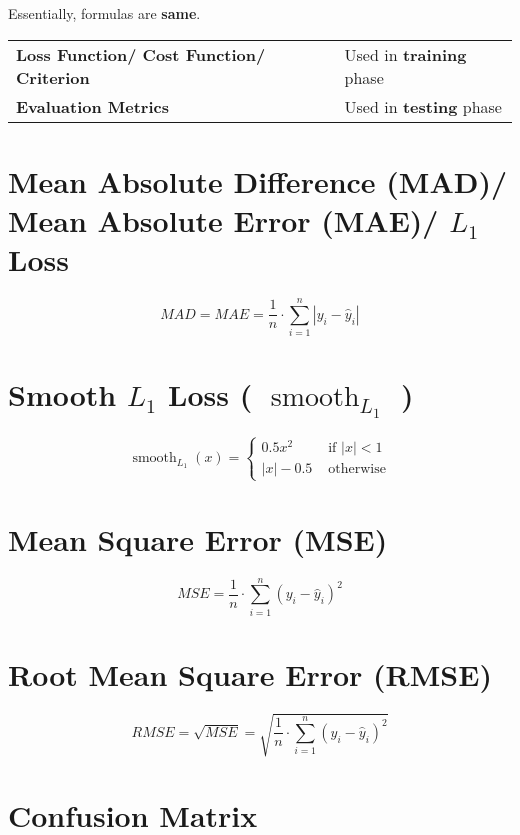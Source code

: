 Essentially, formulas are \textbf{same}.

\begin{table}[h]
    \begin{tabular}{l l}
        \textbf{Loss Function/ Cost Function/ Criterion} & Used in \textbf{training} phase \\
        
        \textbf{Evaluation Metrics} & Used in \textbf{testing} phase \\
    \end{tabular}
\end{table}


\section{Mean Absolute Difference (MAD)/ Mean Absolute Error (MAE)/ $L_1$ Loss}\label{Mean Absolute Difference (MAD)}\label{Mean Absolute Error (MAE)}\label{L1 Loss}

\[
    MAD = MAE = \displaystyle\dfrac{1}{n} \cdot \sum_{i=1}^{n} \left| y_i - \hat{y}_i \right|
\]

\section{Smooth $L_1$ Loss ( $\operatorname{smooth}_{L_1}$ )}
\[
    \displaystyle
    \operatorname{smooth}_{L_1}(x) = \begin{cases}
        0.5x^2 & \text{ if } |x| < 1 \\
        |x| - 0.5 & \text{ otherwise}
    \end{cases}
\]



\section{Mean Square Error (MSE)}\label{Mean Square Error (MSE)}
\[
    MSE = \displaystyle\dfrac{1}{n} \cdot \sum_{i=1}^{n} ( y_i - \hat{y}_i )^2
\]

\section{Root Mean Square Error (RMSE)}\label{Root Mean Square Error (RMSE)}
\[
    RMSE = \sqrt{MSE} = \displaystyle\sqrt{\dfrac{1}{n} \cdot \sum_{i=1}^{n} ( y_i - \hat{y}_i )^2}
\]


\section{Confusion Matrix}

